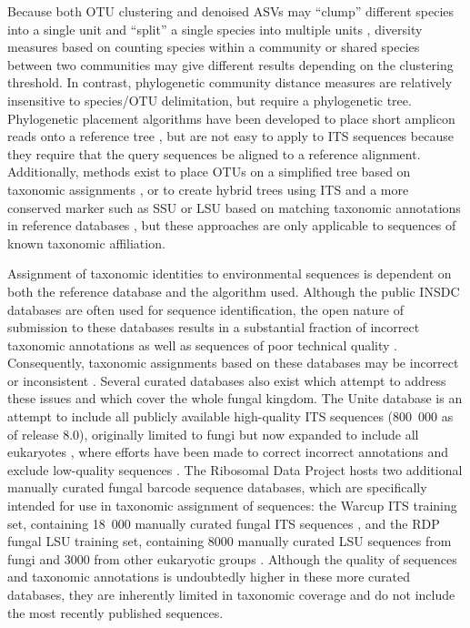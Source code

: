 \documentclass[
  12pt,
]{article}
\begin{document}
Because both OTU clustering and denoised ASVs may ``clump'' different species into a single unit and ``split'' a single species into multiple units \autocite{ryberg2015}, diversity measures based on counting species within a community or shared species between two communities may give different results depending on the clustering threshold.
In contrast, phylogenetic community distance measures \autocite{wong2016} are relatively insensitive to species/OTU delimitation, but require a phylogenetic tree.
Phylogenetic placement algorithms have been developed to place short amplicon reads onto a reference tree \autocite{munch2008a,munch2008,matsen2010,berger2011}, but are not easy to apply to ITS sequences because they require that the query sequences be aligned to a reference alignment.
Additionally, methods exist to place OTUs on a simplified tree based on taxonomic assignments \autocite{tedersoo2018}, or to create hybrid trees using ITS and a more conserved marker such as SSU or LSU based on matching taxonomic annotations in reference databases \autocite{fouquier2016}, but these approaches are only applicable to sequences of known taxonomic affiliation.

Assignment of taxonomic identities to environmental sequences is dependent on both the reference database and the algorithm used.
Although the public INSDC databases \autocite{karsch-mizrachi2018} are often used for sequence identification, the open nature of submission to these databases results in a substantial fraction of incorrect taxonomic annotations \autocite{bidartondo2008,nilsson2006,steinegger2020} as well as sequences of poor technical quality \autocite{ashelford2006,nilsson2012}.
Consequently, taxonomic assignments based on these databases may be incorrect or inconsistent \autocite{nilsson2005}.
Several curated databases also exist which attempt to address these issues and which cover the whole fungal kingdom.
The Unite database is an attempt to include all publicly available high-quality ITS sequences (800~000 as of release 8.0), originally limited to fungi but now expanded to include all eukaryotes \autocite{nilsson2019a}, where efforts have been made to correct incorrect annotations and exclude low-quality sequences \autocite{abarenkov2018a}.
The Ribosomal Data Project \autocite[RDP,][]{cole2014} hosts two additional manually curated fungal barcode sequence databases, which are specifically intended for use in taxonomic assignment of sequences:
the Warcup ITS training set, containing 18~000 manually curated fungal ITS sequences \autocite{deshpande2016}, and the RDP fungal LSU training set, containing 8000 manually curated LSU sequences from fungi and 3000 from other eukaryotic groups \autocite[RDP-LSU,][]{liu2012}.
Although the quality of sequences and taxonomic annotations is undoubtedly higher in these more curated databases, they are inherently limited in taxonomic coverage and do not include the most recently published sequences.
\end{document}
